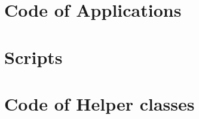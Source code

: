 \begin{landscape}
\begin{multicols}{2}


\section{Code of Applications}






\section{Scripts}


\pagebreak
\section{Code of Helper classes}




%
%
%
%
%
%

\end{multicols}
\end{landscape}
